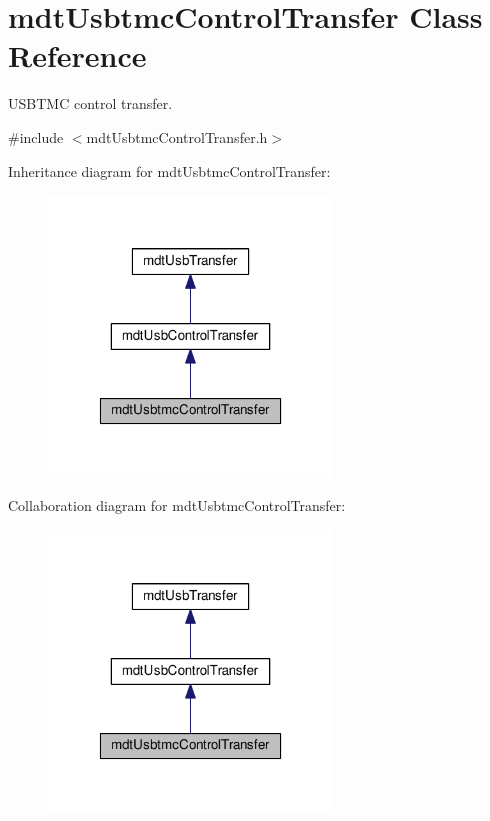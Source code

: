 \hypertarget{classmdt_usbtmc_control_transfer}{\section{mdt\-Usbtmc\-Control\-Transfer Class Reference}
\label{classmdt_usbtmc_control_transfer}
}


U\-S\-B\-T\-M\-C control transfer.  




{\ttfamily \#include $<$mdt\-Usbtmc\-Control\-Transfer.\-h$>$}



Inheritance diagram for mdt\-Usbtmc\-Control\-Transfer\-:\nopagebreak
\begin{figure}[H]
\begin{center}
\leavevmode
\includegraphics[width=214pt]{classmdt_usbtmc_control_transfer__inherit__graph}
\end{center}
\end{figure}


Collaboration diagram for mdt\-Usbtmc\-Control\-Transfer\-:\nopagebreak
\begin{figure}[H]
\begin{center}
\leavevmode
\includegraphics[width=214pt]{classmdt_usbtmc_control_transfer__coll__graph}
\end{center}
\end{figure}
